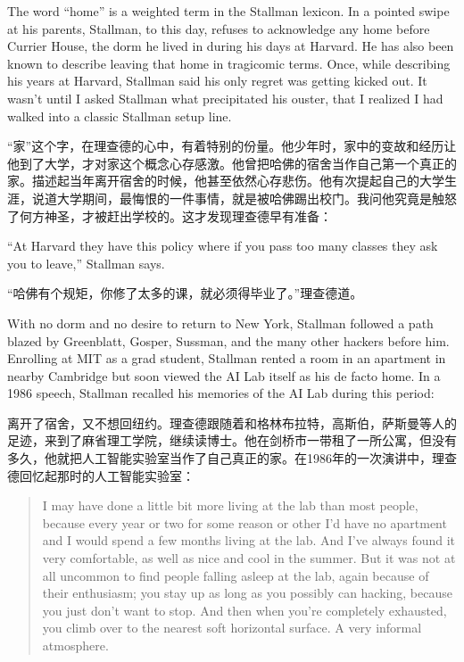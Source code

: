 \ifdefined\eng
The word ``home'' is a weighted term in the Stallman lexicon. In a pointed swipe at his parents, Stallman, to this day, refuses to acknowledge any home before Currier House, the dorm he lived in during his days at Harvard. He has also been known to describe leaving that home in tragicomic terms. Once, while describing his years at Harvard, Stallman said his only regret was getting kicked out. It wasn't until I asked Stallman what precipitated his ouster, that I realized I had walked into a classic Stallman setup line.
\fi

\ifdefined\chs
“家”这个字，在理查德的心中，有着特别的份量。他少年时，家中的变故和经历让他到了大学，才对家这个概念心存感激。他曾把哈佛的宿舍当作自己第一个真正的家。描述起当年离开宿舍的时候，他甚至依然心存悲伤。他有次提起自己的大学生涯，说道大学期间，最悔恨的一件事情，就是被哈佛踢出校门。我问他究竟是触怒了何方神圣，才被赶出学校的。这才发现理查德早有准备：
\fi

\ifdefined\eng
``At Harvard they have this policy where if you pass too many classes they ask you to leave,'' Stallman says.
\fi

\ifdefined\chs
“哈佛有个规矩，你修了太多的课，就必须得毕业了。”理查德道。
\fi

\ifdefined\eng
With no dorm and no desire to return to New York, Stallman followed a path blazed by Greenblatt, Gosper, Sussman, and the many other hackers before him. Enrolling at MIT as a grad student, Stallman rented a room in an apartment in nearby Cambridge but soon viewed the AI Lab itself as his de facto home. In a 1986 speech, Stallman recalled his memories of the AI Lab during this period:
\fi

\ifdefined\chs
离开了宿舍，又不想回纽约。理查德跟随着和格林布拉特，高斯伯，萨斯曼等人的足迹，来到了麻省理工学院，继续读博士。他在剑桥市一带租了一所公寓，但没有多久，他就把人工智能实验室当作了自己真正的家。在1986年的一次演讲中，理查德回忆起那时的人工智能实验室：
\fi

\ifdefined\eng
\begin{quote}
I may have done a little bit more living at the lab than most people, because every year or two for some reason or other I'd have no apartment and I would spend a few months living at the lab. And I've always found it very comfortable, as well as nice and cool in the summer. But it was not at all uncommon to find people falling asleep at the lab, again because of their enthusiasm; you stay up as long as you possibly can hacking, because you just don't want to stop. And then when you're completely exhausted, you climb over to the nearest soft horizontal surface. A very informal atmosphere.
\end{quote}
\fi

